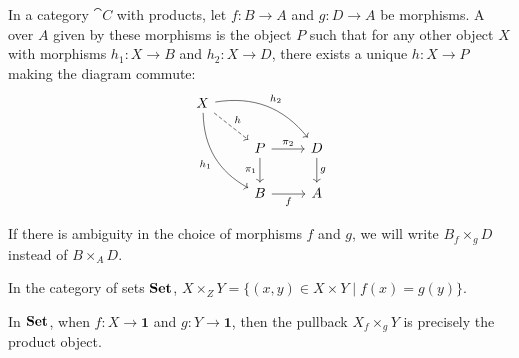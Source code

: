 \begin{node}[Pullbacks]\label{universal-prop-0001}%
\begin{definition}\label{universal-prop-0000}%
In a category $\cat{C}$ with products, let $f\colon B\to A$ and $g\colon D\to A$
be morphisms. A  over $A$ given by these morphisms is
the object $P$ such that for any other object $X$ with morphisms
$h_{1}\colon X\to B$ and $h_{2}\colon X\to D$, there exists a unique
$h\colon X\to P$ making the diagram commute:
\begin{equation*}
\begin{tikzcd}%
  X \arrow[rrd,bend left,"h_{2}"]
    \arrow[ddr,bend right,swap,"h_{1}"]
    \arrow[dr,dashed,"h"] \\
  & P \arrow[d,"\pi_{1}"'] \arrow[r,"\pi_{2}"] & D \arrow[d,"g"]  \\
  & B \arrow[r,swap,"f"]  & A
\end{tikzcd}
\end{equation*}
\end{definition}

\begin{node}[Notation]\label{universal-prop-000A}%
If there is ambiguity in the choice of morphisms $f$ and $g$, we will
write $B\mathbin{{}_{f}\times_{g}}D$ instead of $B\times_{A}D$.
\end{node}

\begin{node}[Example]
In the category of sets $\mathbf{Set}$,
$X\times_{Z}Y=\{(x,y)\in X\times Y\mid f(x)=g(y)\}$.
\end{node}

\begin{node}\label{universal-prop-0002}%
In $\mathbf{Set}$, when $f\colon X\to\mathbf{1}$ and $g\colon Y\to\mathbf{1}$,
then the pullback $X \mathbin{{}_{f}\times_{g}}Y$ is precisely the
product object.
\end{node}
\end{node}

